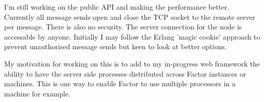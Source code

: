 I'm still working on the public API and making the performance
better. Currently all message sends open and close the TCP socket to
the remote server per message. There is also no security. The server
connection for the node is accessable by anyone. Initially I may
follow the Erlang 'magic cookie' approach to prevent unauthorised
message sends but keen to look at better options.

My motivation for working on this is to add to my in-progress web
framework the ability to have the server side processes distributed
across Factor instances or machines. This is one way to enable Factor
to use multiple processors in a machine for example.
